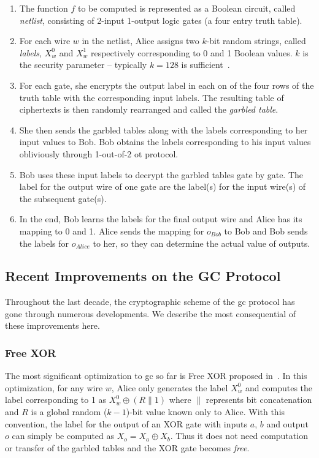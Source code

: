 \begin{enumerate}[label=\roman*.]
\item The function $f$ to be computed is represented as a Boolean circuit, called \textit{\gls{netlist}}, consisting of 2-input 1-output logic gates (a four entry truth table).
\item For each wire $w$ in the \gls{netlist}, Alice assigns two $k$-bit random strings, called \textit{labels}, $X_w^{0}$ and $X_w^{1}$ respectively corresponding to 0 and 1 Boolean values.
      $k$ is the security parameter -- typically $k=128$ is sufficient~\cite{bellare2013efficient}.
\item For each gate, she encrypts the output label in each on of the four rows of the truth table with the corresponding input labels.
      The resulting table of ciphertexts is then randomly rearranged and called the \textit{garbled table}.
\item She then sends the garbled tables along with the labels corresponding to her input values to Bob.
      Bob obtains the labels corresponding to his input values obliviously through 1-out-of-2 \acrshort{ot} protocol.
\item Bob uses these input labels to decrypt the garbled tables gate by gate.
      The label for the output wire of one gate are the label(s) for the input wire(s) of the subsequent gate(s).
\item In the end, Bob learns the labels for the final output wire and Alice has its mapping to 0 and 1.
      Alice sends the mapping for $o_{Bob}$ to Bob and Bob sends the labels for $o_{Alice}$ to her, so they can determine the actual value of outputs.
\end{enumerate}

\subsection{Recent Improvements on the GC Protocol}\label{ssec:prelim-imp}
Throughout the last decade, the cryptographic scheme of the \acrshort{gc} protocol has gone through numerous developments.
We describe the most consequential of these improvements here.

\subsubsection{Free XOR}\label{sssec:prelim-freexor}
The most significant optimization to \acrshort{gc} so far is Free XOR proposed in~\cite{kolesnikov2008improved}.
In this optimization, for any wire $w$, Alice only generates the label $X_w^{0}$ and computes the label corresponding to 1 as $X_w^{0}\oplus (R \parallel 1)$ where $\parallel$ represents bit concatenation and
$R$ is a global random ($k-1$)-bit value known only to Alice.
With this convention, the label for the output of an XOR gate with inputs $a$, $b$ and output $o$ can simply be computed as $X_{o} = X_{a} \oplus X_{b}$.
Thus it does not need computation or transfer of the garbled tables and the XOR gate becomes \textit{free}.

